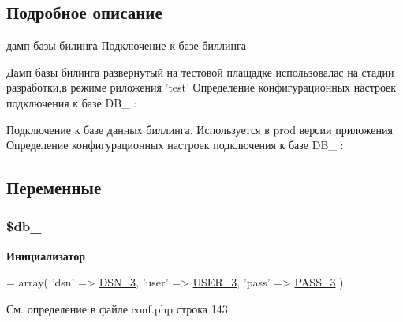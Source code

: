 \subsection{Подробное описание}
дамп базы билинга Подключение к базе биллинга

Дамп базы билинга развернутый на тестовой плащадке использовалас на стадии разработки,в режиме риложения 'test' Определение конфигурационных настроек подключения к базе D\-B\-\_ \-: 


Подключение к базе данных биллинга. Используется в prod версии приложения Определение конфигурационных настроек подключения к базе D\-B\-\_ \-: 
 

\subsection{Переменные}
\hypertarget{group___d_b__3_ga86a3d1ce31d6a69ea9c6b655a3fb10a1}{
\subsubsection[{\$db\-\_\-3}]{\setlength{\rightskip}{0pt plus 5cm}\$db\-\_}}\label{group___d_b__3_ga86a3d1ce31d6a69ea9c6b655a3fb10a1}
{\bfseries Инициализатор}
\begin{DoxyCode}
= array(
    \textcolor{stringliteral}{'dsn'} => \hyperlink{group___d_b__3_ga84e111746d69b14479dbf3f99b4e21ad}{DSN\_3},
    \textcolor{stringliteral}{'user'} => \hyperlink{group___d_b__3_gabb4d4077f995367d73794dcfd8c50a23}{USER\_3},
    \textcolor{stringliteral}{'pass'} => \hyperlink{group___d_b__3_gad7bf3ef090d7da2ae80f4a5f3ab4e67c}{PASS\_3}
)
\end{DoxyCode}


См. определение в файле conf.\-php строка 143

